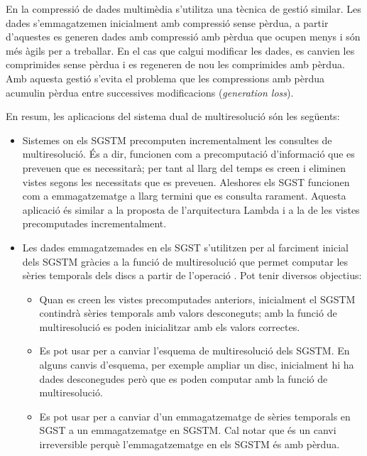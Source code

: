 En la compressió de dades multimèdia s'utilitza una tècnica de gestió
similar.  Les dades s'emmagatzemen inicialment amb compressió sense
pèrdua, a partir d'aquestes es generen dades amb compressió amb pèrdua
que ocupen menys i són més àgils per a treballar. En el cas que calgui
modificar les dades, es canvien les comprimides sense pèrdua i es
regeneren de nou les comprimides amb pèrdua. Amb aquesta gestió
s'evita el problema que les compressions amb pèrdua acumulin pèrdua
entre successives modificacions (\emph{generation loss}).



En resum, les aplicacions del sistema dual de multiresolució són les
següents:
\begin{itemize}
\item Sistemes on els \gls{SGSTM} precomputen incrementalment les
  consultes de multiresolució. És a dir, funcionen com a precomputació
  d'informació que es preveuen que es necessitarà; per tant al llarg
  del temps es creen i eliminen vistes segons les necessitats que es
  preveuen. Aleshores els \gls{SGST} funcionen com a emmagatzematge a
  llarg termini que es consulta rarament.  Aquesta aplicació és
  similar a la proposta de l'arquitectura Lambda i a la de les vistes
  precomputades incrementalment.

\item Les dades emmagatzemades en els \gls{SGST} s'utilitzen per al
  farciment inicial dels \gls{SGSTM} gràcies a la funció de
  multiresolució que permet computar les sèries temporals dels discs a
  partir de l'operació . Pot tenir diversos
  objectius:
  \begin{itemize}
  \item Quan es creen les vistes precomputades anteriors, inicialment
    el \gls{SGSTM} contindrà sèries temporals amb valors desconeguts;
    amb la funció de multiresolució es poden inicialitzar amb els
    valors correctes.

  \item Es pot usar per a canviar l'esquema de multiresolució dels
    \gls{SGSTM}. En alguns canvis d'esquema, per exemple ampliar un
    disc, inicialment hi ha dades desconegudes però que es poden
    computar amb la funció de multiresolució.

  \item Es pot usar per a canviar d'un emmagatzematge de sèries
    temporals en \gls{SGST} a un emmagatzematge en \gls{SGSTM}. Cal
    notar que és un canvi irreversible perquè l'emmagatzematge en els
    \gls{SGSTM} és amb pèrdua.
  \end{itemize}


\end{itemize}
